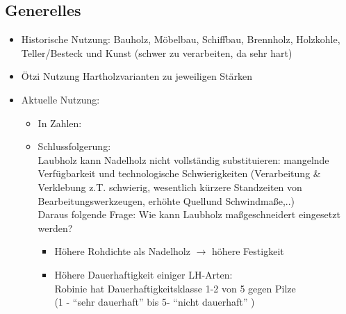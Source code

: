 \documentclass[fleqn,twoside]{article}
\begin{document}
    \subsection{Generelles}
        \begin{itemize}
            \item Historische Nutzung: Bauholz, Möbelbau, Schiffbau, Brennholz, Holzkohle, Teller/Besteck und Kunst (schwer zu verarbeiten, da sehr hart)
            \item Ötzi Nutzung Hartholzvarianten zu jeweiligen Stärken
            \item Aktuelle Nutzung:
                \begin{itemize}
                    \item In Zahlen:\vspace*{3mm} \\
                             \vspace{1mm}
                    \item Schlussfolgerung:\\
                        Laubholz kann Nadelholz nicht vollständig substituieren: mangelnde Verfügbarkeit und technologische Schwierigkeiten (Verarbeitung \& Verklebung z.T. schwierig, wesentlich kürzere Standzeiten von Bearbeitungswerkzeugen, erhöhte Quellund Schwindmaße,..)\\
                        Daraus folgende Frage:
                            Wie kann Laubholz maßgeschneidert eingesetzt werden?
                                \begin{itemize}
                                    \item Höhere Rohdichte als Nadelholz $\rightarrow$ höhere Festigkeit
                                    \item Höhere Dauerhaftigkeit einiger LH-Arten:\\
                                        Robinie hat Dauerhaftigkeitsklasse 1-2 von 5 gegen Pilze\\
                                        (1 - \enquote{sehr dauerhaft} bis 5- \enquote{nicht dauerhaft} )
                                \end{itemize}
                \end{itemize}
        \end{itemize}
\end{document}

